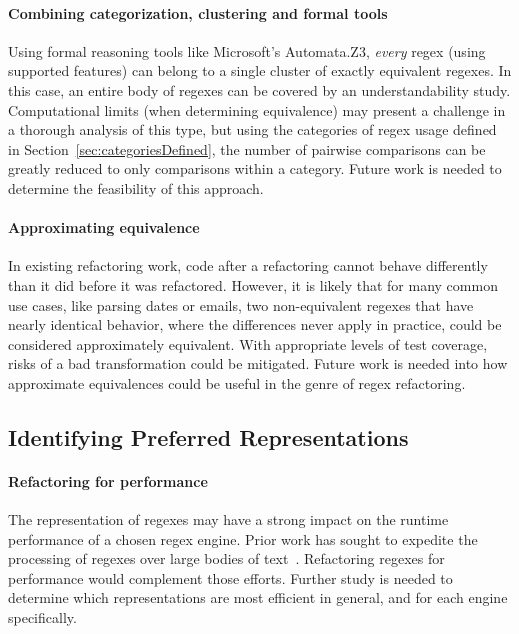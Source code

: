 \paragraph{Combining categorization, clustering and formal tools}  Using formal reasoning tools like Microsoft's Automata.Z3, \emph{every} regex (using supported features) can belong to a single cluster of exactly equivalent regexes.  In this case, an entire body of regexes can be covered by an understandability study.  Computational limits (when determining equivalence) may present a challenge in a thorough analysis of this type, but using the categories of regex usage defined in Section~\ref{sec:categoriesDefined}, the number of pairwise comparisons can be greatly reduced to only comparisons within a category.  Future work is needed to determine the feasibility of this approach.

\paragraph{Approximating equivalence}  In existing refactoring work, code after a refactoring cannot behave differently than it did before it was refactored.  However, it is likely that for many common use cases, like parsing dates or emails, two non-equivalent regexes that have nearly identical behavior, where the differences never apply in practice, could be considered approximately equivalent.  With appropriate levels of test coverage, risks of a bad transformation could be mitigated.  Future work is needed into how approximate equivalences could be useful in the genre of regex refactoring.

\subsection{Identifying Preferred Representations}

\paragraph{Refactoring for performance}  The representation of regexes may have a strong impact on the runtime performance of a chosen regex engine. Prior work has sought to expedite the processing of regexes over large bodies of text~.  Refactoring regexes for performance would complement those efforts.  Further study is needed to determine which representations are most efficient in general, and for each engine specifically.

